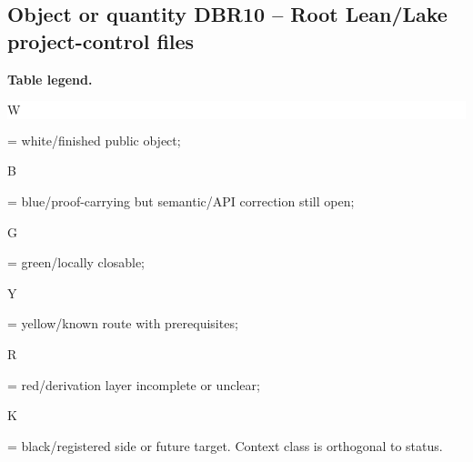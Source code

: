 \subsection*{Object or quantity DBR10 -- Root Lean/\allowbreak{}Lake project-control files}
\hypertarget{objproof:DBR10}{}
\par\smallskip\noindent\begin{minipage}{0.99\linewidth}\footnotesize\raggedright\textbf{Table legend.} \colorbox{white}{\strut W} = white/finished public object; \colorbox{cyan!20}{\strut B} = blue/proof-carrying but semantic/API correction still open; \colorbox{green!18}{\strut G} = green/locally closable; \colorbox{yellow!25}{\strut Y} = yellow/known route with prerequisites; \colorbox{red!20}{\strut R} = red/derivation layer incomplete or unclear; \colorbox{black!18}{\strut K} = black/registered side or future target. Context class is orthogonal to status.\end{minipage}\par\vspace{0.25em}
